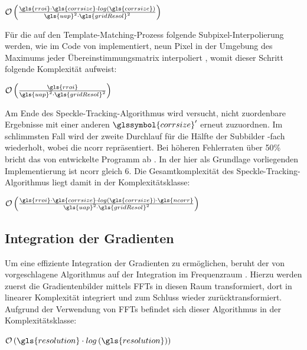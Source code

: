\begin{center}
	$\mathcal{O}\left(\frac{\gls{rroi} \cdot \gls{corrsize} \cdot log\left(\gls{corrsize}\right)}{\gls{uap}^2 \cdot \gls{gridResol}^2}\right)$
\end{center}

Für die auf den Template-Matching-Prozess folgende Subpixel-Interpolierung werden, wie im Code von \citeauthor{Coj17} implementiert, neun Pixel in der Umgebung des Maximums jeder Übereinstimmungsmatrix interpoliert \cite{Coj17}, womit dieser Schritt folgende Komplexität aufweist:

\begin{center}
	$\mathcal{O}\left(\frac{\gls{rroi}}{\gls{uap}^2 \cdot \gls{gridResol}^2}\right)$
\end{center}

Am Ende des Speckle-Tracking-Algorithmus wird versucht, nicht zuordenbare Ergebnisse mit einer anderen  $\glssymbol{corrsize}'$ erneut zuzuordnen. Im schlimmsten Fall wird der zweite Durchlauf für die Hälfte der Subbilder -fach wiederholt, wobei  die \gls{ncorr} repräsentiert. Bei höheren Fehlerraten über 50\% bricht das von \citeauthor{Coj17} entwickelte Programm ab \cite{Coj17}. In der hier als Grundlage vorliegenden Implementierung ist \gls{ncorr} gleich 6. Die Gesamtkomplexität des Speckle-Tracking-Algorithmus liegt damit in der Komplexitätsklasse:

\begin{center}
	$\mathcal{O}\left(\frac{\gls{rroi} \cdot \gls{corrsize} \cdot log\left(\gls{corrsize}\right) \cdot \gls{ncorr}}{\gls{uap}^2 \cdot \gls{gridResol}^2}\right)$
\end{center}

\subsection{Integration der Gradienten}

Um eine effiziente Integration der Gradienten zu ermöglichen, beruht der von \citeauthor{FC88} vorgeschlagene Algorithmus auf der Integration im Frequenzraum \cite{FC88}. Hierzu werden zuerst die Gradientenbilder mittels \glspl{FFT} in diesen Raum transformiert, dort in linearer Komplexität integriert und zum Schluss wieder zurücktransformiert. Aufgrund der Verwendung von \glspl{FFT} befindet sich dieser Algorithmus in der Komplexitätsklasse:

\begin{center}
	$\mathcal{O}\left(\gls{resolution} \cdot log\left(\gls{resolution}\right)\right)$
\end{center}

